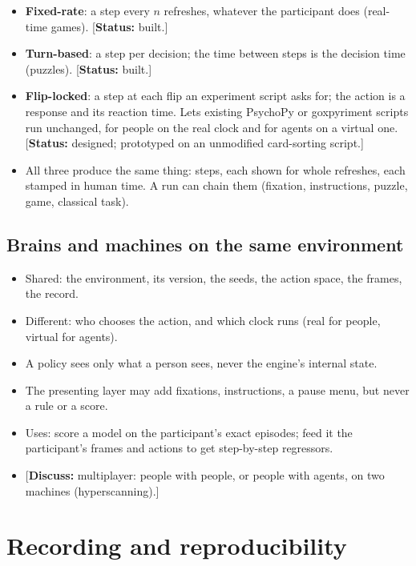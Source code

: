 \documentclass{article}
\newcommand{\status}[1]{\textcolor{teal!70!black}{[\textbf{Status:} #1]}}
\newcommand{\question}[1]{\textcolor{blue!70!black}{[\textbf{Discuss:} #1]}}
\begin{document}
\begin{itemize}
  \item \textbf{Fixed-rate}: a step every $n$ refreshes, whatever the participant does (real-time games). \status{built.}
  \item \textbf{Turn-based}: a step per decision; the time between steps is the decision time (puzzles). \status{built.}
  \item \textbf{Flip-locked}: a step at each flip an experiment script asks for; the action is a response and its reaction time. Lets existing PsychoPy or goxpyriment scripts run unchanged, for people on the real clock and for agents on a virtual one. \status{designed; prototyped on an unmodified card-sorting script.}
  \item All three produce the same thing: steps, each shown for whole refreshes, each stamped in human time. A run can chain them (fixation, instructions, puzzle, game, classical task).
\end{itemize}

\subsection{Brains and machines on the same environment}
\label{sec:players}

\begin{itemize}
  \item Shared: the environment, its version, the seeds, the action space, the frames, the record.
  \item Different: who chooses the action, and which clock runs (real for people, virtual for agents).
  \item A policy sees only what a person sees, never the engine's internal state.
  \item The presenting layer may add fixations, instructions, a pause menu, but never a rule or a score.
  \item Uses: score a model on the participant's exact episodes; feed it the participant's frames and actions to get step-by-step regressors.
  \item \question{multiplayer: people with people, or people with agents, on two machines (hyperscanning).}
\end{itemize}

\section{Recording and reproducibility}
\label{sec:record}
\end{document}
